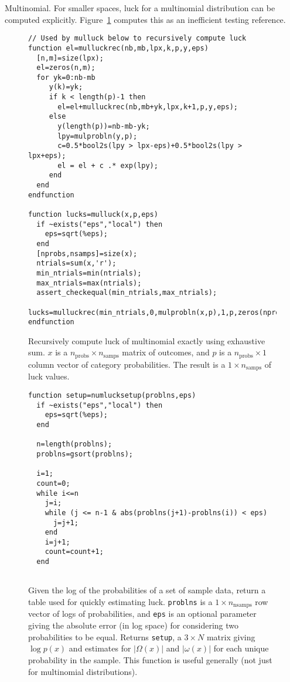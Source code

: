 \begin{example}{Multinomial.}
For smaller spaces, luck for a multinomial distribution can be computed explicitly.  Figure~\ref{fig:mulluck} computes this as an inefficient testing reference.
\begin{figure}
\caption{\label{fig:mulluck}Recursively compute luck of multinomial exactly using exhaustive sum.  $x$ is a $n_{\text{probs}} \times n_{\text{samps}}$ matrix of outcomes, and $p$ is a $n_{\text{probs}} \times 1$ column vector of category probabilities.  The result is a $1 \times n_{\text{samps}}$ of luck values.}
\lstset{language=Scilab}
\begin{lstlisting}
// Used by mulluck below to recursively compute luck
function el=mulluckrec(nb,mb,lpx,k,p,y,eps)
  [n,m]=size(lpx);
  el=zeros(n,m);
  for yk=0:nb-mb
     y(k)=yk;
     if k < length(p)-1 then
       el=el+mulluckrec(nb,mb+yk,lpx,k+1,p,y,eps);
     else
       y(length(p))=nb-mb-yk;
       lpy=mulprobln(y,p);
       c=0.5*bool2s(lpy > lpx-eps)+0.5*bool2s(lpy > lpx+eps);
       el = el + c .* exp(lpy);
     end
  end
endfunction

function lucks=mulluck(x,p,eps)
  if ~exists("eps","local") then
    eps=sqrt(%eps);
  end
  [nprobs,nsamps]=size(x);
  ntrials=sum(x,'r');
  min_ntrials=min(ntrials);
  max_ntrials=max(ntrials);
  assert_checkequal(min_ntrials,max_ntrials);
  lucks=mulluckrec(min_ntrials,0,mulprobln(x,p),1,p,zeros(nprobs,1),eps)
endfunction
\end{lstlisting}
\end{figure}

\begin{figure}
\caption{\label{fig:numlucksetup}Given the log of the probabilities of a set of sample data, return a table used for quickly estimating luck.  {\tt problns} is a $1 \times n_{\text{nsamps}}$ row vector of logs of probabilities, and {\tt eps} is an optional parameter giving the absolute error (in log space) for considering two probabilities to be equal.  Returns {\tt setup}, a $3 \times N$ matrix giving $\log p(x)$ and estimates for $|\Omega(x)|$ and $|\omega(x)|$ for each unique probability in the sample.  This function is useful generally (not just for multinomial distributions).}
\lstset{language=Scilab}
\begin{lstlisting}
function setup=numlucksetup(problns,eps)
  if ~exists("eps","local") then
    eps=sqrt(%eps);
  end

  n=length(problns);
  problns=gsort(problns);

  i=1;
  count=0;
  while i<=n
    j=i;
    while (j <= n-1 & abs(problns(j+1)-problns(i)) < eps)  
      j=j+1;
    end
    i=j+1;
    count=count+1;
  end


\end{lstlisting}
\end{figure}
\end{example}
